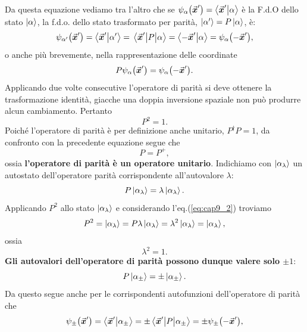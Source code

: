\documentclass[a4paper,12pt,oneside]{book}
\begin{document}
Da questa equazione vediamo tra l'altro che se $\psi_{\alpha}\qty(\va*{x}') = \braket{\va*{x}'}{\alpha}$ è la F.d.O dello stato $\ket{\alpha}$, la f.d.o. dello stato trasformato per parità, $\ket{\alpha'} = P\ket{\alpha}$, è:
\begin{equation}
  \psi_{\alpha'}\qty(\va*{x}') = \braket{\va*{x}'}{\alpha'} = \mel{\va*{x}'}{P}{\alpha} = \braket{-\va*{x}'}{\alpha} = \psi_{\alpha}\qty(-\va*{x}')  ,
\end{equation}
o anche più brevemente, nella rappresentazione delle coordinate
\begin{equation}
  P\psi_{\alpha}\qty(\va*{x}') = \psi_{\alpha}\qty(-\va*{x}') .
\end{equation}
Applicando due volte consecutive l'operatore di parità si deve ottenere la trasformazione identità, giacche una doppia inversione spaziale non può produrre alcun cambiamento. Pertanto
\begin{equation}
  \label{eq:cap9_2}
  P^2 = 1 .
\end{equation}
Poiché l'operatore di parità è per definizione anche unitario, $P^{\dag}P=1$, da confronto con la precedente equazione segue che
\begin{equation}
  P= P^{+} ,
\end{equation}
ossia \textbf{l'operatore di parità è un operatore unitario}.
Indichiamo con $\ket{\alpha_{\lambda}}$ un autostato dell'operatore parità corrispondente all'autovalore $\lambda$:
\begin{equation}
  P\ket{\alpha_{\lambda}} = \lambda\ket{\alpha_{\lambda}} .
\end{equation}
Applicando $P^2$ allo stato $\ket{\alpha_{\lambda}}$ e considerando l'eq.(\ref{eq:cap9_2}) troviamo
\begin{equation}
  P^2 = \ket{\alpha_{\lambda}} = P\lambda\ket{\alpha_{\lambda}} = \lambda^2\ket{\alpha_{\lambda}} = \ket{\alpha_{\lambda}} ,
\end{equation}
ossia
\begin{equation}
  \lambda^2 = 1 .
\end{equation}
\textbf{Gli autovalori dell'operatore di parità possono dunque valere solo $\pm1$}:
\begin{equation}
  P\ket{\alpha_{\pm}} = \pm\ket{\alpha_{\pm}} .
\end{equation}
Da questo segue anche per le corrispondenti autofunzioni dell'operatore di parità che
\begin{equation}
  \psi_{\pm}\qty(\va*{x}') = \braket{\va*{x}'}{\alpha_{\pm}} = \pm\mel{\va*{x}'}{P}{\alpha_{\pm}} = \pm\psi_{\pm}\qty(-\va*{x}') ,
\end{equation}
\end{document}
